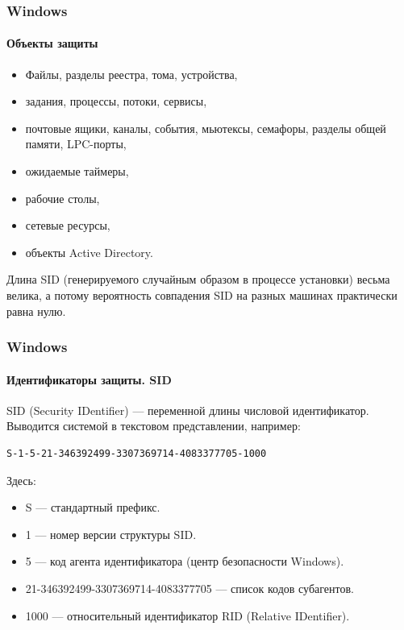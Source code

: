 \begin{frame}
    \frametitle{Windows}
    \framesubtitle{Объекты защиты}
    
    \begin{itemize}
        \item Файлы, разделы реестра, тома, устройства, 
        \item задания, \alert{процессы}, \alert{потоки}, сервисы, 
        \item почтовые ящики, каналы, события, мьютексы, семафоры, разделы общей памяти, LPC-порты, 
        \item ожидаемые таймеры, 
        \item рабочие столы, 
        \item сетевые ресурсы, 
        \item объекты Active Directory.
    \end{itemize}
\end{frame}


Длина SID (генерируемого случайным образом в процессе установки) весьма велика, а потому вероятность совпадения SID на разных машинах практически равна нулю.

\begin{frame}[fragile]
    \frametitle{Windows}
    \framesubtitle{Идентификаторы защиты. SID}
    \alert{SID} (Security IDentifier) --- переменной длины числовой идентификатор. Выводится системой в текстовом представлении, например:
\begin{verbatim}
S-1-5-21-346392499-3307369714-4083377705-1000
\end{verbatim}
    Здесь:
    \begin{itemize}
        \item S --- стандартный префикс.
        \item 1 --- номер версии структуры SID.
        \item 5 --- код агента идентификатора (центр безопасности Windows). 
        \item 21-346392499-3307369714-4083377705 --- список кодов субагентов.
        \item 1000 --- относительный идентификатор \alert{RID} (Relative IDentifier).
    \end{itemize}
\end{frame}


